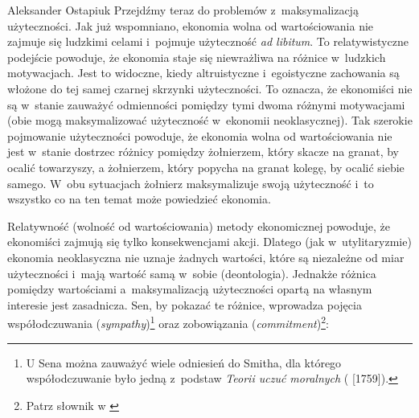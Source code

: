 \begin{artplenv}{Aleksander Ostapiuk}
Przejdźmy teraz do problemów z~maksymalizacją użyteczności. Jak już wspomniano, ekonomia wolna od wartościowania nie
zajmuje się ludzkimi celami i~pojmuje użyteczność \textit{ad libitum}. To relatywistyczne podejście powoduje, że
ekonomia staje się niewrażliwa na różnice w~ludzkich motywacjach. Jest to widoczne, kiedy altruistyczne i~egoistyczne
zachowania są włożone do tej samej czarnej skrzynki użyteczności. To oznacza, że ekonomiści nie są w~stanie
zauważyć odmienności pomiędzy tymi dwoma różnymi motywacjami (obie mogą maksymalizować użyteczność w~ekonomii
neoklasycznej). Tak szerokie pojmowanie użyteczności powoduje, że ekonomia wolna od wartościowania nie jest w~stanie
dostrzec różnicy pomiędzy żołnierzem, który skacze na granat, by ocalić towarzyszy, a żołnierzem, który popycha na
granat kolegę, by ocalić siebie samego. W~obu sytuacjach żołnierz maksymalizuje swoją użyteczność i~to
wszystko co na ten temat może powiedzieć ekonomia. 

Relatywność (wolność od wartościowania) metody ekonomicznej powoduje, że ekonomiści zajmują się tylko konsekwencjami
akcji. Dlatego (jak w~utylitaryzmie) ekonomia neoklasyczna nie uznaje żadnych wartości, które są niezależne od miar
użyteczności i~mają wartość samą w~sobie (deontologia). Jednakże różnica pomiędzy wartościami a~maksymalizacją
użyteczności opartą na własnym interesie jest zasadnicza. Sen, by pokazać te różnice, wprowadza pojęcia
współodczuwania (\textit{sympathy})\footnote{U Sena można zauważyć wiele odniesień do Smitha, dla którego współodczuwanie było
	jedną z~podstaw \textit{Teorii uczuć moralnych}
	(\cite{smith_teoria_1989_ost} [1759]).
} oraz zobowiązania (\textit{commitment})\footnote{Patrz słownik w \parencite{hausman_etyka_2017_ost}}:




\end{artplenv}
